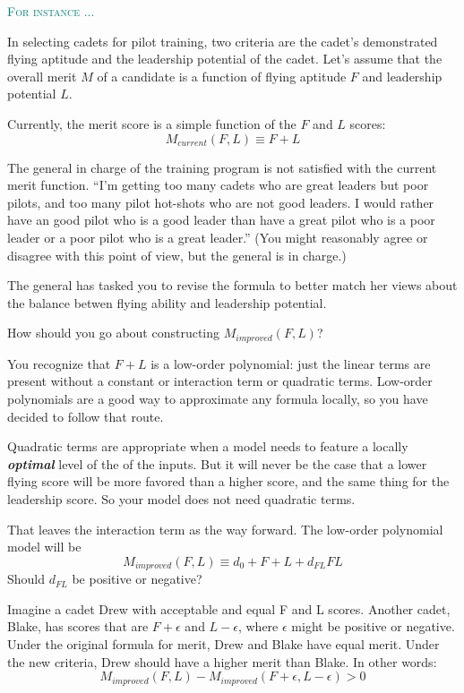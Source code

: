 \documentclass[
  letterpaper,
  DIV=11,
  numbers=noendperiod,
  oneside]{scrreprt}
\newenvironment{example}%
{%
\textcolor{teal}{\hrulefill}%
  \par\vspace{.3\baselineskip}%
  \textcolor{teal}{\scshape For instance ...}%
  \par\vspace{\baselineskip}%
}%
{\textcolor{teal}{\hrulefill}}
\begin{document}
\begin{example}
In selecting cadets for pilot training, two criteria are the cadet's
demonstrated flying aptitude and the leadership potential of the cadet.
Let's assume that the overall merit \(M\) of a candidate is a function
of flying aptitude \(F\) and leadership potential \(L\).

Currently, the merit score is a simple function of the \(F\) and \(L\)
scores: \[M_{current}(F, L) \equiv F + L\]

The general in charge of the training program is not satisfied with the
current merit function. ``I'm getting too many cadets who are great
leaders but poor pilots, and too many pilot hot-shots who are not good
leaders. I would rather have an good pilot who is a good leader than
have a great pilot who is a poor leader or a poor pilot who is a great
leader.'' (You might reasonably agree or disagree with this point of
view, but the general is in charge.)

The general has tasked you to revise the formula to better match her
views about the balance betwen flying ability and leadership potential.

How should you go about constructing \(M_{improved}(F, L)\)?

You recognize that \(F + L\) is a low-order polynomial: just the linear
terms are present without a constant or interaction term or quadratic
terms. Low-order polynomials are a good way to approximate any formula
locally, so you have decided to follow that route.

Quadratic terms are appropriate when a model needs to feature a locally
\textbf{\emph{optimal}} level of the of the inputs. But it will never be
the case that a lower flying score will be more favored than a higher
score, and the same thing for the leadership score. So your model does
not need quadratic terms.

That leaves the interaction term as the way forward. The low-order
polynomial model will be
\[M_{improved}(F, L) \equiv d_0 + F + L + d_{FL} FL\] Should \(d_{FL}\)
be positive or negative?

Imagine a cadet Drew with acceptable and equal F and L scores. Another
cadet, Blake, has scores that are \(F+\epsilon\) and \(L-\epsilon\),
where \(\epsilon\) might be positive or negative. Under the original
formula for merit, Drew and Blake have equal merit. Under the new
criteria, Drew should have a higher merit than Blake. In other words:
\[M_{improved}(F, L) - M_{improved}(F+\epsilon, L-\epsilon) > 0\]


\end{example}
\end{document}

